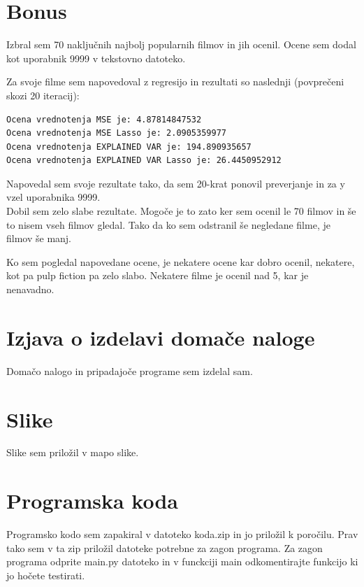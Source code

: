 \documentclass[a4paper,11pt]{article}
\begin{document}
\section{Bonus}
Izbral sem 70 naključnih najbolj popularnih filmov in jih ocenil. Ocene sem dodal kot uporabnik 9999 v tekstovno datoteko.


Za svoje filme sem napovedoval z regresijo in rezultati so naslednji (povprečeni skozi 20 iteracij):

\begin{lstlisting}
Ocena vrednotenja MSE je: 4.87814847532
Ocena vrednotenja MSE Lasso je: 2.0905359977
Ocena vrednotenja EXPLAINED VAR je: 194.890935657
Ocena vrednotenja EXPLAINED VAR Lasso je: 26.4450952912
\end{lstlisting}

Napovedal sem svoje rezultate tako, da sem 20-krat ponovil preverjanje in za y vzel uporabnika 9999.\\
Dobil sem zelo slabe rezultate. Mogoče je to zato ker sem ocenil le 70 filmov in še to nisem vseh filmov gledal. Tako da
ko sem odstranil še negledane filme, je filmov še manj.


Ko sem pogledal napovedane ocene, je nekatere ocene kar dobro ocenil, nekatere, kot pa pulp fiction pa zelo slabo.
Nekatere filme je ocenil nad 5, kar je nenavadno.

	\section{Izjava o izdelavi domače naloge}
	Domačo nalogo in pripadajoče programe sem izdelal sam.
	
	\appendix
	\appendixpage
	\section{\label{app-res}Slike}
	Slike sem priložil v mapo slike.		
	
		
	\section{\label{app-code}Programska koda}
	Programsko kodo sem zapakiral v datoteko koda.zip in jo priložil k poročilu.
	Prav tako sem v ta zip priložil datoteke potrebne za zagon programa.
	Za zagon programa odprite main.py datoteko in v funckciji main odkomentirajte funkcijo ki jo hočete testirati.
\end{document}
